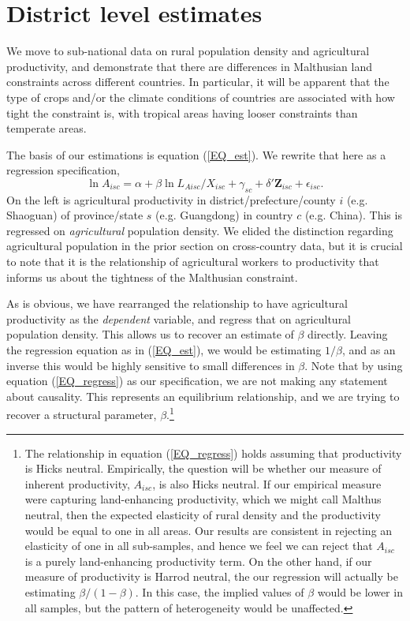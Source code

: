 \documentclass[11pt]{article}
\begin{document}
\section{District level estimates}
We move to sub-national data on rural population density and agricultural productivity, and demonstrate that there are differences in Malthusian land constraints across different countries. In particular, it will be apparent that the type of crops and/or the climate conditions of countries are associated with how tight the constraint is, with tropical areas having looser constraints than temperate areas.

The basis of our estimations is equation (\ref{EQ_est}). We rewrite that here as a regression specification,
\begin{equation}
	\ln A_{isc} = \alpha + \beta \ln L_{Aisc}/X_{isc} + \gamma_{sc} + \delta' \mathbf{Z}_{isc} + \epsilon_{isc}. \label{EQ_regress}
\end{equation}
On the left is agricultural productivity in district/prefecture/county $i$ (e.g. Shaoguan) of province/state $s$ (e.g. Guangdong) in country $c$ (e.g. China). This is regressed on \textit{agricultural} population density. We elided the distinction regarding agricultural population in the prior section on cross-country data, but it is crucial to note that it is the relationship of agricultural workers to productivity that informs us about the tightness of the Malthusian constraint.

As is obvious, we have rearranged the relationship to have agricultural productivity as the \textit{dependent} variable, and regress that on agricultural population density. This allows us to recover an estimate of $\beta$ directly. Leaving the regression equation as in (\ref{EQ_est}), we would be estimating $1/\beta$, and as an inverse this would be highly sensitive to small differences in $\beta$. Note that by using equation (\ref{EQ_regress}) as our specification, we are not making any statement about causality. This represents an equilibrium relationship, and we are trying to recover a structural parameter, $\beta$.\footnote{The relationship in equation (\ref{EQ_regress}) holds assuming that productivity is Hicks neutral. Empirically, the question will be whether our measure of inherent productivity, $A_{isc}$, is also Hicks neutral. If our empirical measure were capturing land-enhancing productivity, which we might call Malthus neutral, then the expected elasticity of rural density and the productivity would be equal to one in all areas. Our results are consistent in rejecting an elasticity of one in all sub-samples, and hence we feel we can reject that $A_{isc}$ is a purely land-enhancing productivity term. On the other hand, if our measure of productivity is Harrod neutral, the our regression will actually be estimating $\beta/(1-\beta)$. In this case, the implied values of $\beta$ would be lower in all samples, but the pattern of heterogeneity would be unaffected.}
\end{document}
